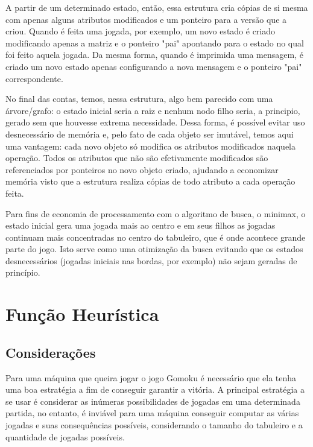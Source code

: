 \documentclass{article}
\begin{document}
        A partir de um determinado estado, então, essa estrutura cria cópias de
        si mesma com apenas alguns atributos modificados e um ponteiro para a
        versão que a criou. Quando é feita uma jogada, por exemplo, um novo
        estado é criado modificando apenas a matriz e o ponteiro "pai"
        apontando para o estado no qual foi feito aquela jogada. Da mesma
        forma, quando é imprimida uma mensagem, é criado um novo estado apenas
        configurando a nova mensagem e o ponteiro "pai" correspondente.
        
        No final das contas, temos, nessa estrutura, algo bem parecido com uma
        árvore/grafo: o estado inicial seria a raiz e nenhum nodo filho seria,
        a principio, gerado sem que houvesse extrema necessidade. Dessa forma,
        é possível evitar uso desnecessário de memória e, pelo fato de cada
        objeto ser imutável, temos aqui uma vantagem: cada novo objeto só
        modifica os atributos modificados naquela operação. Todos os atributos
        que não são efetivamente modificados são referenciados por ponteiros no
        novo objeto criado, ajudando a economizar memória visto que a estrutura
        realiza cópias de todo atributo a cada operação feita.
        
        Para fins de economia de processamento com o algoritmo de busca, o
        minimax, o estado inicial gera uma jogada mais ao centro e em seus
        filhos as jogadas continuam mais concentradas no centro do tabuleiro,
        que é onde acontece grande parte do jogo. Isto serve como uma
        otimização da busca evitando que os estados desnecessários (jogadas
        iniciais nas bordas, por exemplo) não sejam geradas de princípio.
    
    \section*{Função Heurística}
        \subsection*{Considerações}
        Para uma máquina que queira jogar o jogo Gomoku é necessário que ela
        tenha uma boa estratégia a fim de conseguir garantir a vitória. A
        principal estratégia a se usar é considerar as inúmeras possibilidades
        de jogadas em uma determinada partida, no entanto, é inviável para uma
        máquina conseguir computar as várias jogadas e suas consequências
        possíveis, considerando o tamanho do tabuleiro e a quantidade de
        jogadas possíveis.
        
\end{document}
